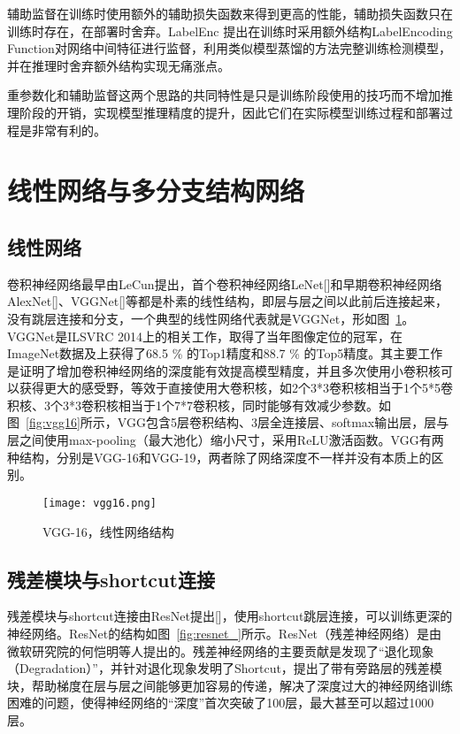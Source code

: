 辅助监督在训练时使用额外的辅助损失函数来得到更高的性能，辅助损失函数只在训练时存在，在部署时舍弃。LabelEnc \cite{hao2020labelenc} 提出在训练时采用额外结构LabelEncoding Function对网络中间特征进行监督，利用类似模型蒸馏的方法完整训练检测模型，并在推理时舍弃额外结构实现无痛涨点。

重参数化和辅助监督这两个思路的共同特性是只是训练阶段使用的技巧而不增加推理阶段的开销，实现模型推理精度的提升，因此它们在实际模型训练过程和部署过程是非常有利的。

\section{线性网络与多分支结构网络}

\subsection{线性网络}

卷积神经网络最早由LeCun提出，首个卷积神经网络LeNet[]和早期卷积神经网络AlexNet[]、VGGNet[]等都是朴素的线性结构，即层与层之间以此前后连接起来，没有跳层连接和分支，一个典型的线性网络代表就是VGGNet，形如图~\ref{fig:vgg16_}。VGGNet是ILSVRC 2014上的相关工作，取得了当年图像定位的冠军，在ImageNet数据及上获得了68.5 \% 的Top1精度和88.7 \% 的Top5精度。其主要工作是证明了增加卷积神经网络的深度能有效提高模型精度，并且多次使用小卷积核可以获得更大的感受野，等效于直接使用大卷积核，如2个3*3卷积核相当于1个5*5卷积核、3个3*3卷积核相当于1个7*7卷积核，同时能够有效减少参数。如图~\ref{fig:vgg16}所示，VGG包含5层卷积结构、3层全连接层、softmax输出层，层与层之间使用max-pooling（最大池化）缩小尺寸，采用ReLU激活函数。VGG有两种结构，分别是VGG-16和VGG-19，两者除了网络深度不一样并没有本质上的区别。

\begin{figure}[]
    \centering
    \texttt{[image: vgg16.png]}	%
    \caption{VGG-16，线性网络结构}
    \label{fig:vgg16_} %
\end{figure}

\subsection{残差模块与shortcut连接}

残差模块与shortcut连接由ResNet提出[]，使用shortcut跳层连接，可以训练更深的神经网络。ResNet的结构如图~\ref{fig:resnet_}所示。ResNet（残差神经网络）是由微软研究院的何恺明等人提出的。残差神经网络的主要贡献是发现了“退化现象（Degradation）”，并针对退化现象发明了Shortcut，提出了带有旁路层的残差模块，帮助梯度在层与层之间能够更加容易的传递，解决了深度过大的神经网络训练困难的问题，使得神经网络的“深度”首次突破了100层，最大甚至可以超过1000层。

